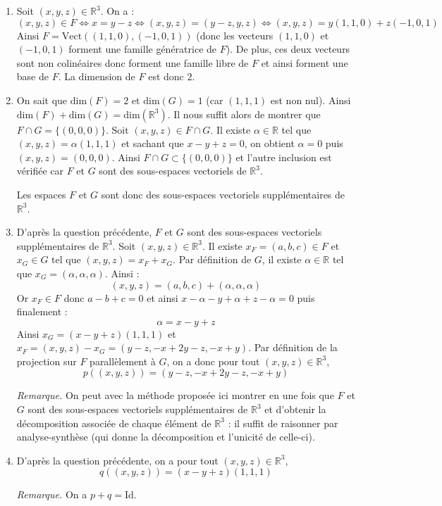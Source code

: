 \documentclass[a4paper,10pt]{report}
\begin{document}
\corr  

\begin{enumerate}
\item Soit $(x,y,z) \in \mathbb{R}^3$. On a :
$$ (x,y,z) \in F \Longleftrightarrow x=y-z \Longleftrightarrow (x,y,z) = (y-z,y,z) \Longleftrightarrow (x,y,z) = y(1,1,0) + z(-1,0,1)$$
Ainsi $F = \textrm{Vect}((1,1,0), (-1,0,1))$ (donc les vecteurs $(1,1,0)$ et $(-1,0,1)$ forment une famille génératrice de $F$). De plus, ces deux vecteurs sont non colinéaires donc forment une famille libre de $F$ et ainsi forment une base de $F$. La dimension de $F$ est donc $2$.
\item On sait que $\textrm{dim}(F)=2$ et $\textrm{dim}(G)=1$ (car $(1,1,1)$ est non nul). Ainsi $\textrm{dim}(F) + \textrm{dim}(G) = \textrm{dim}(\mathbb{R}^3)$. Il nous suffit alors de montrer que $F \cap G = \lbrace (0,0,0) \rbrace$. Soit $(x,y,z) \in F \cap G$. Il existe $\alpha \in \mathbb{R}$ tel que $(x,y,z) = \alpha (1,1,1)$ et sachant que $x-y+z=0$, on obtient $\alpha = 0$ puis $(x,y,z)=(0,0,0)$. Ainsi $F \cap G \subset \lbrace (0,0,0) \rbrace$ et l'autre inclusion est vérifiée car $F$ et $G$ sont des sous-espaces vectoriels de $\mathbb{R}^3$.

\medskip

\noindent Les espaces $F$ et $G$ sont donc des sous-espaces vectoriels supplémentaires de $\mathbb{R}^3$.
\item D'après la question précédente, $F$ et $G$ sont  des sous-espaces vectoriels supplémentaires de $\mathbb{R}^3$. Soit $(x,y,z) \in \mathbb{R}^3$. Il existe $x_F = (a,b,c) \in F$ et $x_G \in G$ tel que $(x,y,z) = x_F + x_G$. Par définition de $G$, il existe $\alpha \in \mathbb{R}$ tel que $x_G = (\alpha, \alpha, \alpha)$. Ainsi :
$$ (x,y,z) = (a,b,c) + (\alpha, \alpha, \alpha)$$
Or $x_F \in F$ donc $a-b+c=0$ et ainsi $x- \alpha- y + \alpha + z - \alpha = 0$ puis finalement :
$$ \alpha = x-y+z $$
Ainsi $x_G = (x-y+z) (1,1,1)$ et $x_F = (x,y,z) - x_G = (y-z, -x+2y-z,-x+y)$. Par définition de la projection sur $F$ parallèlement à $G$, on a donc pour tout $(x,y,z) \in \mathbb{R}^3$,
$$ p((x,y,z)) = (y-z, -x+2y-z,-x+y)$$

\medskip

\noindent \textit{Remarque.} On peut avec la méthode proposée ici montrer en une fois que $F$ et $G$ sont des sous-espaces vectoriels supplémentaires de $\mathbb{R}^3$ et d'obtenir la décomposition associée de chaque élément de $\mathbb{R}^3$ : il suffit de raisonner par analyse-synthèse (qui donne la décomposition et l'unicité de celle-ci).
\item D'après la question précédente, on a pour tout $(x,y,z) \in \mathbb{R}^3$, 
$$ q((x,y,z)) = (x-y+z) (1,1,1)$$

\medskip

\noindent \textit{Remarque.} On a $p+q=\textrm{Id}$.
\end{enumerate}
\end{document}
